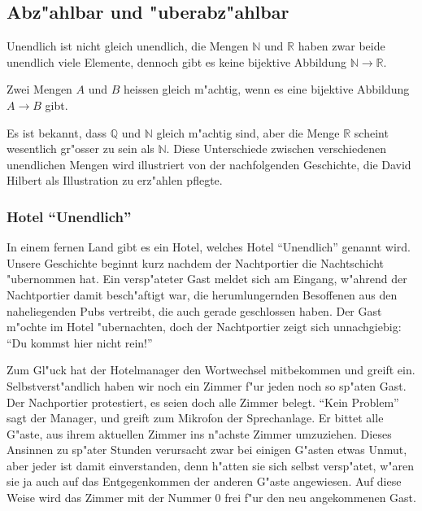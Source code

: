 \subsection{Abz"ahlbar und "uberabz"ahlbar}
Unendlich ist nicht gleich unendlich, die Mengen $\mathbb N$ und
$\mathbb R$ haben zwar beide unendlich viele Elemente, dennoch
gibt es keine bijektive Abbildung $\mathbb N\to \mathbb R$.

\begin{definition}
Zwei Mengen $A$ und $B$ heissen gleich m"achtig, wenn es eine bijektive
Abbildung $A\to B$ gibt.
\end{definition}

Es ist bekannt, dass $\mathbb Q$ und $\mathbb N$ gleich m"achtig sind,
aber die Menge $\mathbb R$ scheint wesentlich gr"osser
zu sein als $\mathbb N$.
Diese Unterschiede zwischen verschiedenen
unendlichen Mengen wird illustriert von der nachfolgenden Geschichte,
die David Hilbert als Illustration zu erz"ahlen pflegte.

\subsubsection{Hotel ``Unendlich''}
In einem fernen Land gibt es ein Hotel, welches Hotel ``Unendlich'' 
genannt wird. Unsere Geschichte beginnt kurz nachdem der Nachtportier
die Nachtschicht "ubernommen hat. Ein versp"ateter Gast meldet sich
am Eingang, w"ahrend der Nachtportier damit besch"aftigt war,
die herumlungernden Besoffenen
aus den naheliegenden Pubs vertreibt, die auch gerade geschlossen haben.
Der Gast m"ochte im Hotel "ubernachten, doch der Nachtportier zeigt sich
unnachgiebig: ``Du kommst hier nicht rein!''

Zum Gl"uck hat der Hotelmanager den Wortwechsel mitbekommen und greift
ein. Selbstverst"andlich haben wir noch ein Zimmer f"ur jeden noch so
sp"aten Gast. Der Nachportier protestiert, es seien doch alle Zimmer
belegt. ``Kein Problem'' sagt der Manager, und greift zum Mikrofon
der Sprechanlage. Er bittet alle G"aste, aus ihrem aktuellen Zimmer
ins n"achste Zimmer umzuziehen. Dieses Ansinnen zu sp"ater Stunden
verursacht zwar bei einigen G"asten etwas Unmut, aber jeder ist damit
einverstanden, denn h"atten sie sich selbst versp"atet, w"aren sie ja
auch auf das Entgegenkommen der anderen G"aste angewiesen. Auf diese
Weise wird das Zimmer mit der Nummer $0$ frei f"ur den neu angekommenen
Gast.

